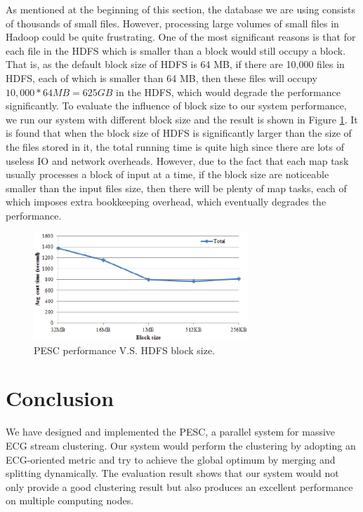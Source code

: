 \documentclass[conference]{IEEEtran}
\begin{document}
As mentioned at the beginning of this section, the database we are using consists of thousands of small files. However, processing large volumes of small files in Hadoop could be quite frustrating. One of the most significant reasons is that for each file in the HDFS which is smaller than a block would still occupy a block. That is, as the default block size of HDFS is 64 MB, if there are 10,000 files in HDFS, each of which is smaller than 64 MB, then these files will occupy $ 10,000 * 64 MB = 625 GB $ in the HDFS, which would degrade the performance significantly. To evaluate the influence of block size to our system performance, we run our system with different block size and the result is shown in Figure \ref{fig_block_size}. It is found that when the block size of HDFS is significantly larger than the size of the files stored in it, the total running time is quite high since there are lots of useless IO and network overheads. However, due to the fact that each map task usually processes a block of input at a time, if the block size are noticeable smaller than the input files size, then there will be plenty of map tasks, each of which imposes extra bookkeeping overhead, which eventually degrades the performance.
\begin{figure}[!t]
\centering
\includegraphics[height=1.6in]{./Figure/block_size.eps}
\caption{PESC performance V.S. HDFS block size.}
\label{fig_block_size}
\end{figure}



\section{Conclusion}
We have designed and implemented the PESC, a parallel system for massive ECG stream clustering. Our system would perform the clustering by adopting an ECG-oriented metric and try to achieve the global optimum by merging and splitting dynamically. The evaluation result shows that our system would not only provide a good clustering result but also produces an excellent performance on multiple computing nodes.
\end{document}
